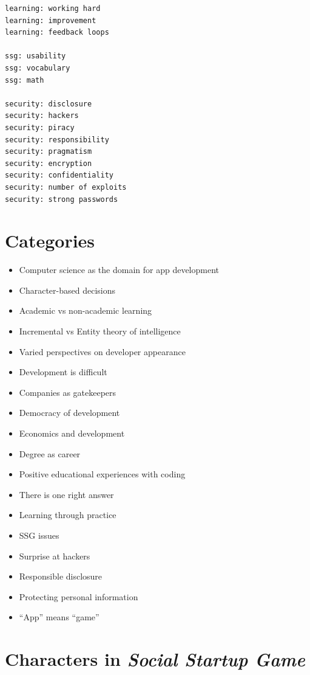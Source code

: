 \documentclass[letterpaper]{article}
\begin{document}
\begin{multicols}{2}
\begin{verbatim}
learning: working hard
learning: improvement
learning: feedback loops

ssg: usability
ssg: vocabulary
ssg: math

security: disclosure
security: hackers
security: piracy
security: responsibility
security: pragmatism
security: encryption
security: confidentiality
security: number of exploits
security: strong passwords
\end{verbatim}
\end{multicols}

\clearpage
\section{Categories}
\label{appendix:categories}
\begin{itemize}
\item[] Computer science as the domain for app development
\item[] Character-based decisions
\item[] Academic vs non-academic learning
\item[] Incremental vs Entity theory of intelligence
\item[] Varied perspectives on developer appearance
\item[] Development is difficult
\item[] Companies as gatekeepers
\item[] Democracy of development
\item[] Economics and development
\item[] Degree as career
\item[] Positive educational experiences with coding
\item[] There is one right answer
\item[] Learning through practice
\item[] SSG issues
\item[] Surprise at hackers
\item[] Responsible disclosure
\item[] Protecting personal information
\item[] ``App'' means ``game''
\end{itemize}

\clearpage
\section{Characters in \textit{Social Startup Game}}

\newenvironment{character}[3]
{
\begin{tabular}{p{1.25in}p{4in}}
\raisebox{-0.5\height}{\texttt{[image: images/\#1.png]}} &
\textbf{#1 #2}
\begin{itemize*}
#3
\end{itemize*}
}
{
\end{tabular}
\bigskip
}
\end{document}
